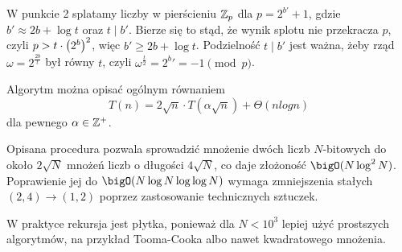 W punkcie 2 splatamy liczby w pierścieniu \( \mathbb{Z}_p \) dla \( p = 2^{b'} + 1 \), gdzie \( b' \approx 2b + \log t \) oraz \( t \mid b' \). Bierze się to stąd, że wynik splotu nie przekracza \( p \), czyli \( p > t \cdot \left(2^b\right)^2 \), więc \( b' \geq 2b + \log t \).
Podzielność \( t \mid b' \) jest ważna, żeby rząd \( \omega = 2^{\frac{2b}{t}} \) był równy \( t \), czyli \( \omega^{\frac{t}{2}} = 2^b' = -1 \pmod{p} \).

Algorytm można opisać ogólnym równaniem
\[
    T(n) = 2 \sqrt{n} \cdot T(\alpha \sqrt{n}) + \Theta(n log n)
\]
dla pewnego \( \alpha \in \mathbb{Z}^{+} \).

Opisana procedura pozwala sprowadzić mnożenie dwóch liczb \( N \)-bitowych do około \( 2\sqrt{N} \) mnożeń liczb o długości \( 4\sqrt{N} \), co daje złożoność \( \bigO(N \log^2 N) \).
Poprawienie jej do \( \bigO(N \log N \log \log N) \) wymaga zmniejszenia stałych \( (2, 4) \rightarrow (1, 2) \) poprzez zastosowanie technicznych sztuczek.
        
W praktyce rekursja jest płytka, ponieważ dla \( N < 10^3 \) lepiej użyć prostszych algorytmów, na przykład Tooma-Cooka albo nawet kwadratowego mnożenia.
